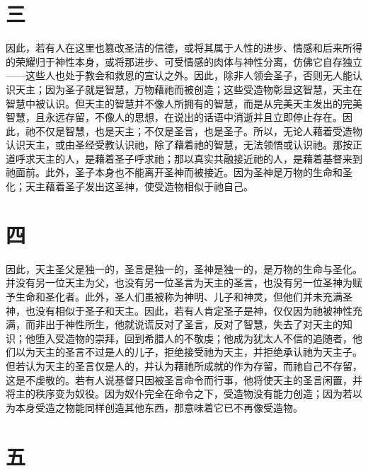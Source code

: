 
\section{三}

因此，若有人在这里也篡改圣洁的信德，或将其属于人性的进步、情感和后来所得的荣耀归于神性本身，或将那进步、可受情感的肉体与神性分离，仿佛它自存独立——这些人也处于教会和救恩的宣认之外。因此，除非人领会圣子，否则无人能认识天主；因为圣子就是智慧，万物藉祂而被创造；这些受造物彰显这智慧，天主在智慧中被认识。但天主的智慧并不像人所拥有的智慧，而是从完美天主发出的完美智慧，且永远存留，不像人的思想，在说出的话语中消逝并且立即停止存在。因此，祂不仅是智慧，也是天主；不仅是圣言，也是圣子。所以，无论人藉着受造物认识天主，或由圣经受教认识祂，除了藉着祂的智慧，无法领悟或认识祂。那按正道呼求天主的人，是藉着圣子呼求祂；那以真实共融接近祂的人，是藉着基督来到祂面前。此外，圣子本身也不能离开圣神而被接近。因为圣神是万物的生命和圣化；天主藉着圣子发出这圣神，使受造物相似于祂自己。\par


\section{四}

因此，天主圣父是独一的，圣言是独一的，圣神是独一的，是万物的生命与圣化。并没有另一位天主为父，也没有另一位圣言为天主的圣言，也没有另一位圣神为赋予生命和圣化者。此外，圣人们虽被称为神明、儿子和神灵，但他们并未充满圣神，也没有相似于圣子和天主。因此，若有人肯定圣子是神，仅仅因为祂被神性充满，而非出于神性所生，他就说谎反对了圣言，反对了智慧，失去了对天主的知识；他堕入受造物的崇拜，回到希腊人的不敬虔；他成为犹太人不信的追随者，他们以为天主的圣言不过是人的儿子，拒绝接受祂为天主，并拒绝承认祂为天主子。但若认为天主的圣言仅是人的，并认为藉祂所成就的作为存留，而祂自己不存留，这是不虔敬的。若有人说基督只因被圣言命令而行事，他将使天主的圣言闲置，并将主的秩序变为奴役。因为奴仆完全在命令之下，受造物没有能力创造；因为若以为本身受造之物能同样创造其他东西，那意味着它已不再像受造物。\par


\section{五}

